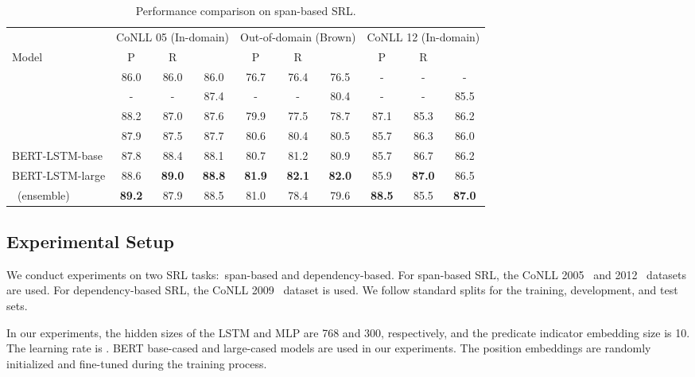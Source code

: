 \documentclass[11pt,a4paper]{article}
\begin{document}
\begin{table*}[t]
	\centering
	\small
	\begin{tabular}{l ccc ccc ccc}
		\toprule
		& \multicolumn{3}{c}{CoNLL 05 (In-domain)} &  \multicolumn{3}{c}{Out-of-domain (Brown)} & \multicolumn{3}{c}{CoNLL 12 (In-domain)}  \\ 
		\cmidrule(lr){2-4} \cmidrule(lr){5-7} \cmidrule{8-10}
		Model  & P & R &  & P & R &  & P & R &  \\
		\midrule
		\citet{strubell2018linguistically} & 86.0 & 86.0 & 86.0 & 76.7 & 76.4 & 76.5  & - & - & - \\
		\citet{he2018jointly} & - & - & 87.4 & - & - & 80.4  & - & - & 85.5 \\
		\citet{ouchi2018span} & 88.2 & 87.0 & 87.6 & 79.9 & 77.5 & 78.7  &87.1 & 85.3 & 86.2 \\  
		\citet{li2019dependency}  & 87.9 & 87.5 & 87.7 & 80.6 & 80.4 & 80.5  & 85.7 & 86.3 & 86.0\\  \cmidrule{1-10}
		BERT-LSTM-base  & 87.8 & 88.4 & 88.1 & 80.7 & 81.2 & 80.9  & 85.7 & 86.7 & 86.2\\
		BERT-LSTM-large  & 88.6 & \textbf{89.0} & \textbf{88.8} & \textbf{81.9} &\textbf{82.1}&\textbf{82.0 } &  85.9 & \textbf{87.0} &  86.5\\
		\midrule
		\citet{ouchi2018span}~(ensemble)  &\textbf{89.2 }& 87.9 & 88.5 & 81.0 & 78.4 & 79.6 &  \textbf{88.5} & 85.5& \textbf{87.0}\\
		\bottomrule
	\end{tabular}
	\caption{Performance comparison on span-based SRL.}
	\label{res:conll12}
	\vspace{-1mm}
\end{table*}



\subsection{Experimental Setup}

We conduct experiments on two SRL tasks:\ span-based and dependency-based. 
For span-based SRL, the CoNLL 2005~\cite{carreras2004introduction} and 2012~\cite{pradhan2013towards} datasets are used. 
For dependency-based SRL, the CoNLL 2009~\cite{hajivc2009conll} dataset is used. 
We follow standard splits for the training, development, and test sets.

In our experiments, the hidden sizes of the LSTM and MLP are 768 and 300, respectively, and the predicate indicator embedding size is 10.
The learning rate is .  
BERT base-cased and large-cased models are used in our experiments. 
The position embeddings are randomly initialized and fine-tuned during the training process.
\end{document}
